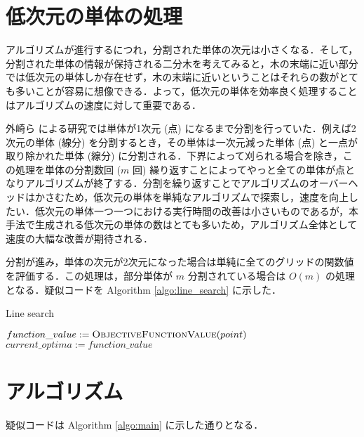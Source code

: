\documentclass[a4paper,11pt]{jreport}
\begin{document}
\section{低次元の単体の処理}

アルゴリズムが進行するにつれ，分割された単体の次元は小さくなる．そして，分割された単体の情報が保持される二分木を考えてみると，木の末端に近い部分では低次元の単体しか存在せず，木の末端に近いということはそれらの数がとても多いことが容易に想像できる．よって，低次元の単体を効率良く処理することはアルゴリズムの速度に対して重要である．\par
外崎ら \cite{tonosaki} による研究では単体が1次元 (点) になるまで分割を行っていた．例えば2次元の単体 (線分) を分割するとき，その単体は一次元減った単体 (点) と一点が取り除かれた単体 (線分) に分割される．下界によって刈られる場合を除き，この処理を単体の分割数回 ($ m $ 回) 繰り返すことによってやっと全ての単体が点となりアルゴリズムが終了する．分割を繰り返すことでアルゴリズムのオーバーヘッドはかさむため，低次元の単体を単純なアルゴリズムで探索し，速度を向上したい．低次元の単体一つ一つにおける実行時間の改善は小さいものであるが，本手法で生成される低次元の単体の数はとても多いため，アルゴリズム全体として速度の大幅な改善が期待される．\par
分割が進み，単体の次元が2次元になった場合は単純に全てのグリッドの関数値を評価する．この処理は，部分単体が $ m $ 分割されている場合は $ O(m) $ の処理となる．疑似コードを Algorithm \ref{algo:line_search} に示した．\par

\begin{algorithm}
\caption{Line search}
\label{algo:line_search}
\begin{algorithmic}[1]
\State $ function\_value := \Call{ObjectiveFunctionValue}{point} $
\State $current\_optima := function\_value $
\EndIf
\EndFor
\EndFunction
\end{algorithmic}
\end{algorithm}

\section{アルゴリズム}

疑似コードは Algorithm \ref{algo:main} に示した通りとなる．\par
\end{document}
